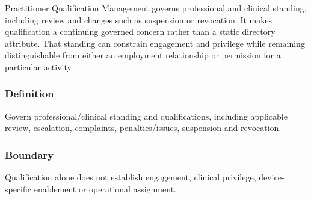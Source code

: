 Practitioner Qualification Management governs professional and clinical standing, including review and changes such as suspension or revocation. It makes qualification a continuing governed concern rather than a static directory attribute. That standing can constrain engagement and privilege while remaining distinguishable from either an employment relationship or permission for a particular activity.

\subsubsection*{Definition}

Govern professional/\allowbreak{}clinical standing and qualifications, including applicable review, escalation, complaints, penalties/\allowbreak{}issues, suspension and revocation.

\subsubsection*{Boundary}

Qualification alone does not establish engagement, clinical privilege, device-specific enablement or operational assignment.

